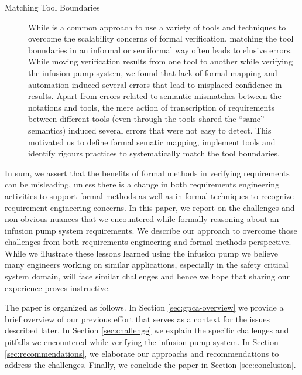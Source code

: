 \begin{description}
    \item[Matching Tool Boundaries] While is a common approach to use a variety of tools and techniques to overcome the scalability concerns of formal verification, matching the tool boundaries in an informal or semiformal way often leads to elusive errors. While moving verification results from one tool to another while verifying the infusion pump system, we found that lack of formal mapping and automation induced several errors that lead to misplaced confidence in results. Apart from errors related to semantic mismatches between the notations and tools, the mere action of transcription of requirements between different tools (even through the tools shared the “same” semantics) induced several errors that were not easy to detect. This motivated us to define formal sematic mapping, implement tools and identify rigours practices to systematically match the tool boundaries.
\end{description}

In sum, we assert that the benefits of formal methods in verifying requirements can be misleading, unless there is a change in both requirements engineering activities to support formal methods as well as in formal techniques to recognize requirement engineering concerns. In this paper, we report on the challenges and non-obvious nuances that we encountered while formally reasoning about an infusion pump system requirements. We describe our approach to overcome those challenges from both requirements engineering and formal methods perspective. While we illustrate these lessons learned using the infusion pump we believe many engineers working on similar applications, especially in the safety critical system domain, will face similar challenges and hence we hope that sharing our experience proves instructive. %

The paper is organized as follows. In Section \ref{sec:gpca-overview} we provide a brief overview of our previous effort that serves as a context for the issues described later. In Section \ref{sec:challenge} we explain the specific challenges and pitfalls we encountered while verifying the infusion pump system. In Section \ref{sec:recommendations}, we elaborate our approachs and recommendations to address the challenges. Finally, we conclude the paper in Section \ref{sec:conclusion}.
\iffalse

